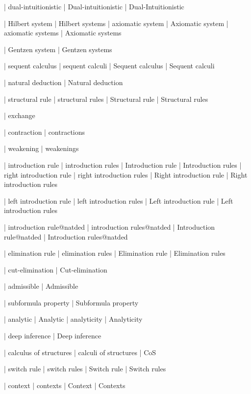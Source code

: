  | dual-intuitionistic
 | Dual-intuitionistic
 | Dual-Intuitionistic

 | Hilbert system
 | Hilbert systems
 | axiomatic system
 | Axiomatic system
 | axiomatic systems
 | Axiomatic systems

 | Gentzen system
 | Gentzen systems

 | sequent calculus
 | sequent calculi
 | Sequent calculus
 | Sequent calculi

 | natural deduction
 | Natural deduction

 | structural rule
 | structural rules
 | Structural rule
 | Structural rules

 | exchange

 | contraction
 | contractions

 | weakening
 | weakenings

 | introduction rule
 | introduction rules
 | Introduction rule
 | Introduction rules
 | right introduction rule
 | right introduction rules
 | Right introduction rule
 | Right introduction rules

 | left introduction rule
 | left introduction rules
 | Left introduction rule
 | Left introduction rules

 | introduction rule@natded
 | introduction rules@natded
 | Introduction rule@natded
 | Introduction rules@natded

 | elimination rule
 | elimination rules
 | Elimination rule
 | Elimination rules

 | cut-elimination
 | Cut-elimination

 | admissible
 | Admissible

 | subformula property
 | Subformula property

 | analytic
 | Analytic
 | analyticity
 | Analyticity

 | deep inference
 | Deep inference

 | calculus of structures
 | calculi of structures
 | CoS
 
 | switch rule
 | switch rules
 | Switch rule
 | Switch rules
 
 | context
 | contexts
 | Context
 | Contexts

